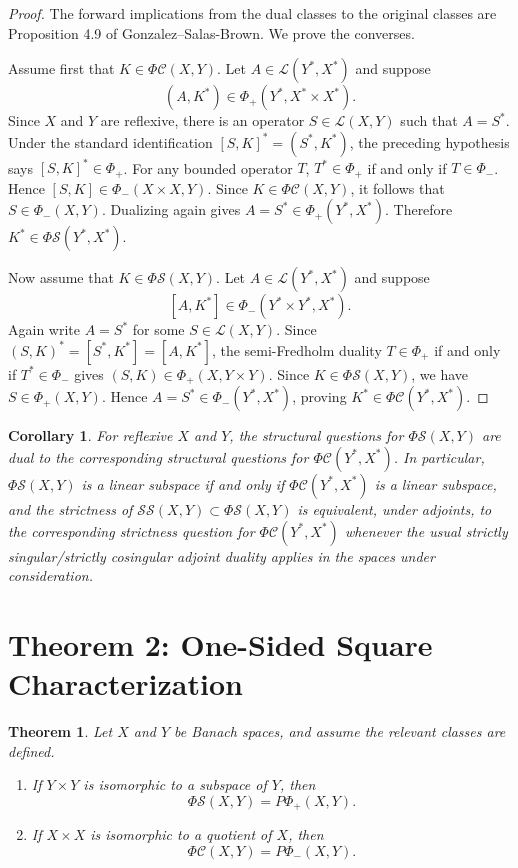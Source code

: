 \documentclass[11pt]{article}
\newtheorem{theorem}{Theorem}
\newtheorem{corollary}{Corollary}
\newcommand{\LL}{\mathcal L}
\newcommand{\SSing}{\mathcal{SS}}
\newcommand{\PhiS}{\Phi\mathcal S}
\newcommand{\PhiC}{\Phi\mathcal C}
\newcommand{\PhiPlus}{\Phi_+}
\newcommand{\PhiMinus}{\Phi_-}
\begin{document}
\begin{proof}
The forward implications from the dual classes to the original classes are
Proposition 4.9 of Gonzalez--Salas-Brown.  We prove the converses.

Assume first that \(K\in\PhiC(X,Y)\).  Let \(A\in\LL(Y^*,X^*)\) and suppose
\[
(A,K^*)\in\PhiPlus(Y^*,X^*\times X^*).
\]
Since \(X\) and \(Y\) are reflexive, there is an operator \(S\in\LL(X,Y)\)
such that \(A=S^*\).  Under the standard identification
\([S,K]^*=(S^*,K^*)\), the preceding hypothesis says
\([S,K]^*\in\PhiPlus\).  For any bounded operator \(T\), \(T^*\in\PhiPlus\)
if and only if \(T\in\PhiMinus\).  Hence
\([S,K]\in\PhiMinus(X\times X,Y)\).  Since \(K\in\PhiC(X,Y)\), it follows
that \(S\in\PhiMinus(X,Y)\).  Dualizing again gives
\(A=S^*\in\PhiPlus(Y^*,X^*)\).  Therefore \(K^*\in\PhiS(Y^*,X^*)\).

Now assume that \(K\in\PhiS(X,Y)\).  Let \(A\in\LL(Y^*,X^*)\) and suppose
\[
[A,K^*]\in\PhiMinus(Y^*\times Y^*,X^*).
\]
Again write \(A=S^*\) for some \(S\in\LL(X,Y)\).  Since
\((S,K)^*=[S^*,K^*]=[A,K^*]\), the semi-Fredholm duality
\(T\in\PhiPlus\) if and only if \(T^*\in\PhiMinus\) gives
\((S,K)\in\PhiPlus(X,Y\times Y)\).  Since \(K\in\PhiS(X,Y)\), we have
\(S\in\PhiPlus(X,Y)\).  Hence \(A=S^*\in\PhiMinus(Y^*,X^*)\), proving
\(K^*\in\PhiC(Y^*,X^*)\).
\end{proof}

\begin{corollary}
For reflexive \(X\) and \(Y\), the structural questions for
\(\PhiS(X,Y)\) are dual to the corresponding structural questions for
\(\PhiC(Y^*,X^*)\).  In particular, \(\PhiS(X,Y)\) is a linear subspace if
and only if \(\PhiC(Y^*,X^*)\) is a linear subspace, and the strictness of
\(\SSing(X,Y)\subset \PhiS(X,Y)\) is equivalent, under adjoints, to the
corresponding strictness question for \(\PhiC(Y^*,X^*)\) whenever the usual
strictly singular/strictly cosingular adjoint duality applies in the spaces
under consideration.
\end{corollary}

\section*{Theorem 2: One-Sided Square Characterization}

\begin{theorem}
Let \(X\) and \(Y\) be Banach spaces, and assume the relevant classes are
defined.
\begin{enumerate}
\item If \(Y\times Y\) is isomorphic to a subspace of \(Y\), then
\[
\PhiS(X,Y)=P\Phi_+(X,Y).
\]

\item If \(X\times X\) is isomorphic to a quotient of \(X\), then
\[
\PhiC(X,Y)=P\Phi_-(X,Y).
\]
\end{enumerate}
\end{theorem}
\end{document}
